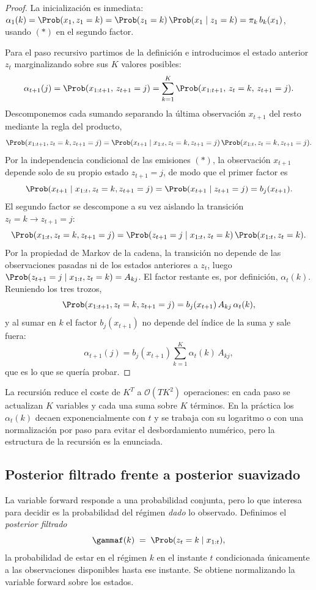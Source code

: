 \begin{proof}
La inicialización es inmediata: $\alpha_1(k) = \Prob(x_1, z_1 = k) = \Prob(z_1 = k)\,\Prob(x_1 \mid z_1 = k) = \pi_k\, b_k(x_1)$, usando $(\ast)$ en el segundo factor.

Para el paso recursivo partimos de la definición e introducimos el estado anterior $z_t$ marginalizando sobre sus $K$ valores posibles:
\[
\alpha_{t+1}(j)
= \Prob(x_{1:t+1},\, z_{t+1} = j)
= \sum_{k=1}^{K} \Prob(x_{1:t+1},\, z_t = k,\, z_{t+1} = j).
\]
Descomponemos cada sumando separando la última observación $x_{t+1}$ del resto mediante la regla del producto,
\[
\Prob(x_{1:t+1}, z_t = k, z_{t+1} = j)
= \Prob(x_{t+1} \mid x_{1:t}, z_t = k, z_{t+1} = j)\,
  \Prob(x_{1:t}, z_t = k, z_{t+1} = j).
\]
Por la independencia condicional de las emisiones $(\ast)$, la observación $x_{t+1}$ depende solo de su propio estado $z_{t+1} = j$, de modo que el primer factor es
\[
\Prob(x_{t+1} \mid x_{1:t}, z_t = k, z_{t+1} = j) = \Prob(x_{t+1} \mid z_{t+1} = j) = b_j(x_{t+1}).
\]
El segundo factor se descompone a su vez aislando la transición $z_t = k \to z_{t+1} = j$:
\[
\Prob(x_{1:t}, z_t = k, z_{t+1} = j)
= \Prob(z_{t+1} = j \mid x_{1:t}, z_t = k)\, \Prob(x_{1:t}, z_t = k).
\]
Por la propiedad de Markov de la cadena, la transición no depende de las observaciones pasadas ni de los estados anteriores a $z_t$, luego $\Prob(z_{t+1} = j \mid x_{1:t}, z_t = k) = A_{kj}$. El factor restante es, por definición, $\alpha_t(k)$. Reuniendo los tres trozos,
\[
\Prob(x_{1:t+1}, z_t = k, z_{t+1} = j) = b_j(x_{t+1})\, A_{kj}\, \alpha_t(k),
\]
y al sumar en $k$ el factor $b_j(x_{t+1})$ no depende del índice de la suma y sale fuera:
\[
\alpha_{t+1}(j) = b_j(x_{t+1}) \sum_{k=1}^{K} \alpha_t(k)\, A_{kj},
\]
que es lo que se quería probar.
\end{proof}

La recursión reduce el coste de $K^T$ a $\mathcal{O}(T K^2)$ operaciones: en cada paso se actualizan $K$ variables y cada una suma sobre $K$ términos. En la práctica los $\alpha_t(k)$ decaen exponencialmente con $t$ y se trabaja con su logaritmo o con una normalización por paso para evitar el desbordamiento numérico, pero la estructura de la recursión es la enunciada.

\subsection{Posterior filtrado frente a posterior suavizado}
\label{sec:hmm-filtrado}

La variable forward responde a una probabilidad conjunta, pero lo que interesa para decidir es la probabilidad del régimen \emph{dado} lo observado. Definimos el \emph{posterior filtrado}
\[
\gammaf(k) \;=\; \Prob(z_t = k \mid x_{1:t}),
\]
la probabilidad de estar en el régimen $k$ en el instante $t$ condicionada únicamente a las observaciones disponibles hasta ese instante. Se obtiene normalizando la variable forward sobre los estados.

